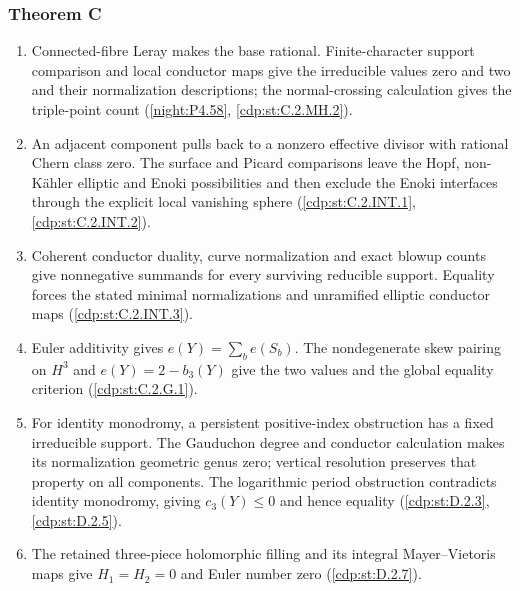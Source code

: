 \subsubsection*{Theorem C}
\begin{enumerate}[label=\arabic*.,leftmargin=*]
\item\hypertarget{step-II-C-1}{} Connected-fibre Leray makes the
base rational. Finite-character support comparison and local
conductor maps give the irreducible values zero and two and their
normalization descriptions; the normal-crossing calculation gives
the triple-point count
(\hyperref[night:P4.58]{\ref*{night:P4.58}},
\hyperref[cdp:st:C.2.MH.2]{\ref*{cdp:st:C.2.MH.2}}).
\item\hypertarget{step-II-C-2}{} An adjacent component pulls back
to a nonzero effective divisor with rational Chern class zero.
The surface and Picard comparisons leave the Hopf, non-K\"ahler
elliptic and Enoki possibilities and then exclude the Enoki
interfaces through the explicit local vanishing sphere
(\hyperref[cdp:st:C.2.INT.1]{\ref*{cdp:st:C.2.INT.1}},
\hyperref[cdp:st:C.2.INT.2]{\ref*{cdp:st:C.2.INT.2}}).
\item\hypertarget{step-II-C-3}{} Coherent conductor duality, curve
normalization and exact blowup counts give nonnegative summands
for every surviving reducible support. Equality forces the stated
minimal normalizations and unramified elliptic conductor maps
(\hyperref[cdp:st:C.2.INT.3]{\ref*{cdp:st:C.2.INT.3}}).
\item\hypertarget{step-II-C-4}{} Euler additivity gives
$e(Y)=\sum_b e(S_b)$. The nondegenerate skew pairing on $H^3$
and $e(Y)=2-b_3(Y)$ give the two values and the global equality
criterion (\hyperref[cdp:st:C.2.G.1]{\ref*{cdp:st:C.2.G.1}}).
\item\hypertarget{step-II-C-5}{} For identity monodromy, a
persistent positive-index obstruction has a fixed irreducible
support. The Gauduchon degree and conductor calculation makes
its normalization geometric genus zero; vertical resolution
preserves that property on all components. The logarithmic
period obstruction contradicts identity monodromy, giving
$c_3(Y)\le0$ and hence equality
(\hyperref[cdp:st:D.2.3]{\ref*{cdp:st:D.2.3}},
\hyperref[cdp:st:D.2.5]{\ref*{cdp:st:D.2.5}}).
\item\hypertarget{step-II-C-6}{} The retained three-piece
holomorphic filling and its integral Mayer--Vietoris maps give
$H_1=H_2=0$ and Euler number zero
(\hyperref[cdp:st:D.2.7]{\ref*{cdp:st:D.2.7}}).
\end{enumerate}

